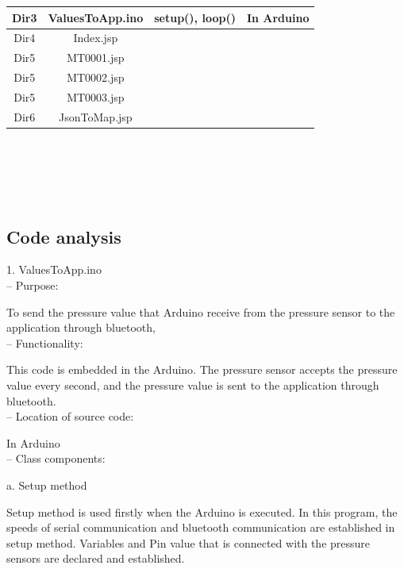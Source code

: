 \documentclass[conference]{IEEEtran}
\begin{document}
\begin{table}[H]
\begin{tabular}{|c|c|c|c|}
Dir3 & ValuesToApp.ino & setup(), loop() & In Arduino \\ \hline  

Dir4 & Index.jsp & & \\ \hline

Dir5 & MT0001.jsp & & \\ \hline

Dir5 & MT0002.jsp & & \\ \hline

Dir5 & MT0003.jsp & & \\ \hline

Dir6 & JsonToMap.jsp & & \\ \hline

\end{tabular}\\\\\\\\

\end{table}

\subsection{Code analysis\\}

1. ValuesToApp.ino\\

 -- Purpose: 

To send the pressure value that Arduino receive from the pressure sensor to the application through bluetooth,\\

 --	Functionality:

This code is embedded in the Arduino. The pressure sensor accepts the pressure value every second, and the pressure value is sent to the application through bluetooth. \\

 --	Location of source code:

In Arduino\\

 --	Class components:

a. Setup method 

Setup method is used firstly when the Arduino is executed. In this program, the speeds of serial communication and bluetooth communication are established in setup method. Variables and Pin value that is connected with the pressure sensors are declared and established. 
\end{document}
